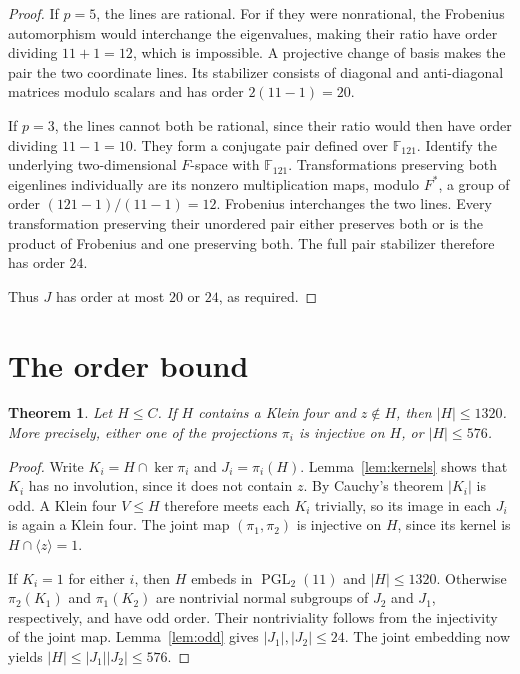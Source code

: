 \documentclass[11pt]{article}
\newtheorem{theorem}{Theorem}
\newcommand{\PGL}{\operatorname{PGL}}
\newcommand{\F}{\mathbb F}
\begin{document}
\begin{proof}
If $p=5$, the lines are rational. For if they were nonrational, the
Frobenius automorphism would interchange the eigenvalues, making their
ratio have order dividing $11+1=12$, which is impossible. A projective
change of basis makes the pair the two coordinate lines. Its stabilizer
consists of diagonal and anti-diagonal matrices modulo scalars and has
order $2(11-1)=20$.

If $p=3$, the lines cannot both be rational, since their ratio would
then have order dividing $11-1=10$. They form a conjugate pair defined
over $\F_{121}$. Identify the underlying two-dimensional $F$-space with
$\F_{121}$. Transformations preserving both eigenlines individually
are its nonzero multiplication maps, modulo $F^*$, a group of order
$(121-1)/(11-1)=12$. Frobenius interchanges the two lines. Every
transformation preserving their unordered pair either preserves both
or is the product of Frobenius and one preserving both. The full pair
stabilizer therefore has order $24$.

Thus $J$ has order at most $20$ or $24$, as required.
\end{proof}

\section{The order bound}
\begin{theorem}\label{thm:bound}
Let $H\leq C$. If $H$ contains a Klein four and $z\notin H$, then
$|H|\leq1320$. More precisely, either one of the projections $\pi_i$
is injective on $H$, or $|H|\leq576$.
\end{theorem}
\begin{proof}
Write $K_i=H\cap\ker\pi_i$ and $J_i=\pi_i(H)$. Lemma~\ref{lem:kernels}
shows that $K_i$ has no involution, since it does not contain $z$.
By Cauchy's theorem $|K_i|$ is odd. A Klein four $V\leq H$ therefore
meets each $K_i$ trivially, so its image in each $J_i$ is again a
Klein four. The joint map $(\pi_1,\pi_2)$ is injective on $H$, since
its kernel is $H\cap\langle z\rangle=1$.

If $K_i=1$ for either $i$, then $H$ embeds in $\PGL_2(11)$ and
$|H|\leq1320$. Otherwise $\pi_2(K_1)$ and $\pi_1(K_2)$ are
nontrivial normal subgroups of $J_2$ and $J_1$, respectively, and
have odd order. Their nontriviality follows from the injectivity
of the joint map. Lemma~\ref{lem:odd} gives $|J_1|,|J_2|\leq24$.
The joint embedding now yields $|H|\leq|J_1||J_2|\leq576$.
\end{proof}
\end{document}
